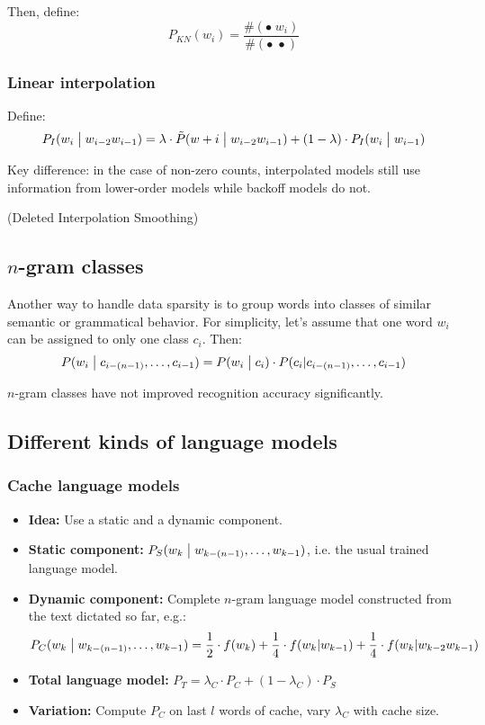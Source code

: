 Then, define:
\[
    P_{KN}(w_i) = \frac{\#(\bullet \; w_i)}{\#(\bullet \; \bullet)}
\]

\subsubsection{Linear interpolation}

Define:
\[
    P_I(w_i \bigm| w_{i-2}w_{i-1}) = \lambda \cdot \tilde{P}(w+i \bigm| w_{i-2}w_{i-1}) + (1 - \lambda) \cdot P_I(w_{i} \bigm| w_{i-1})
\]

Key difference: in the case of non-zero counts, interpolated models still use information from lower-order models while backoff models do not.

(Deleted Interpolation Smoothing)

\subsection{$n$-gram classes}

Another way to handle data sparsity is to group words into classes of similar semantic or grammatical behavior. For simplicity, let's assume that one word $w_i$ can be assigned to only one class $c_i$. Then:
\[
    P(w_i \bigm| c_{i-(n-1)}, \ldots, c_{i-1}) = P(w_i \bigm| c_i) \cdot P(c_i | c_{i-(n-1)}, \ldots, c_{i-1})
\]

$n$-gram classes have not improved recognition accuracy significantly.

\subsection{Different kinds of language models}

\subsubsection{Cache language models}
\begin{itemize}
    \item \textbf{Idea:} Use a static and a dynamic component.
    \item \textbf{Static component:} $P_S(w_k \bigm| w_{k-(n-1)}, \ldots, w_{k-1})$, i.e. the usual trained language model.
    \item \textbf{Dynamic component:} Complete $n$-gram language model constructed from the text dictated so far, e.g.:
        \[
            P_C(w_k \bigm| w_{k-(n-1)}, \ldots, w_{k-1}) = \frac{1}{2} \cdot f(w_k) + \frac{1}{4} \cdot f(w_k | w_{k-1}) + \frac{1}{4} \cdot f(w_k | w_{k-2} w_{k-1})
        \]
    \item \textbf{Total language model:} $P_T = \lambda_C \cdot P_C + (1 - \lambda_C) \cdot P_S$
    \item \textbf{Variation:} Compute $P_C$ on last $l$ words of cache, vary $\lambda_C$ with cache size.
\end{itemize}

